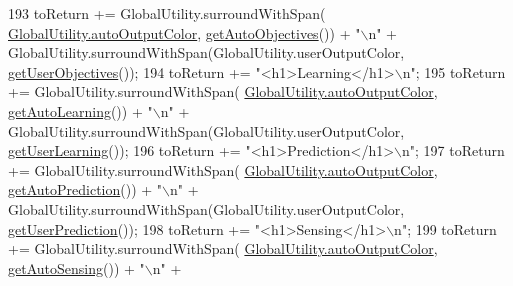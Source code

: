 \begin{DoxyCode}
193             toReturn += GlobalUtility.surroundWithSpan(
      \hyperlink{classit_1_1isislab_1_1masonassisteddocumentation_1_1mason_1_1analizer_1_1_global_utility_a2e086c8a2d8edf16b2eaf90408832adc}{GlobalUtility.autoOutputColor}, \hyperlink{classit_1_1isislab_1_1masonassisteddocumentation_1_1_o_d_d_1_1_design_concepts_af9a9892725b7e74361ac73f7d351365a}{getAutoObjectives}()) + \textcolor{stringliteral}{"\(\backslash\)n"} + 
      GlobalUtility.surroundWithSpan(GlobalUtility.userOutputColor, \hyperlink{classit_1_1isislab_1_1masonassisteddocumentation_1_1_o_d_d_1_1_design_concepts_af1aeb61eab6fe385b4a958e4d0eec052}{getUserObjectives}());
194             toReturn += \textcolor{stringliteral}{"<h1>Learning</h1>\(\backslash\)n"};
195             toReturn += GlobalUtility.surroundWithSpan(
      \hyperlink{classit_1_1isislab_1_1masonassisteddocumentation_1_1mason_1_1analizer_1_1_global_utility_a2e086c8a2d8edf16b2eaf90408832adc}{GlobalUtility.autoOutputColor}, \hyperlink{classit_1_1isislab_1_1masonassisteddocumentation_1_1_o_d_d_1_1_design_concepts_ad5ffe908aa701e43745cdeb738f089b9}{getAutoLearning}()) + \textcolor{stringliteral}{"\(\backslash\)n"} + 
      GlobalUtility.surroundWithSpan(GlobalUtility.userOutputColor, \hyperlink{classit_1_1isislab_1_1masonassisteddocumentation_1_1_o_d_d_1_1_design_concepts_af626c1c092b7eddfbb671514e8feba76}{getUserLearning}());
196             toReturn += \textcolor{stringliteral}{"<h1>Prediction</h1>\(\backslash\)n"};
197             toReturn += GlobalUtility.surroundWithSpan(
      \hyperlink{classit_1_1isislab_1_1masonassisteddocumentation_1_1mason_1_1analizer_1_1_global_utility_a2e086c8a2d8edf16b2eaf90408832adc}{GlobalUtility.autoOutputColor}, \hyperlink{classit_1_1isislab_1_1masonassisteddocumentation_1_1_o_d_d_1_1_design_concepts_a895614b33e13c896a110b69f73a40d59}{getAutoPrediction}()) + \textcolor{stringliteral}{"\(\backslash\)n"} + 
      GlobalUtility.surroundWithSpan(GlobalUtility.userOutputColor, \hyperlink{classit_1_1isislab_1_1masonassisteddocumentation_1_1_o_d_d_1_1_design_concepts_af0cab8b67f33a90d945f2cde505bec44}{getUserPrediction}());
198             toReturn += \textcolor{stringliteral}{"<h1>Sensing</h1>\(\backslash\)n"};
199             toReturn += GlobalUtility.surroundWithSpan(
      \hyperlink{classit_1_1isislab_1_1masonassisteddocumentation_1_1mason_1_1analizer_1_1_global_utility_a2e086c8a2d8edf16b2eaf90408832adc}{GlobalUtility.autoOutputColor}, \hyperlink{classit_1_1isislab_1_1masonassisteddocumentation_1_1_o_d_d_1_1_design_concepts_acba4bb8653f6fbe984314bad8ee66022}{getAutoSensing}()) + \textcolor{stringliteral}{"\(\backslash\)n"} + 

\end{DoxyCode}
